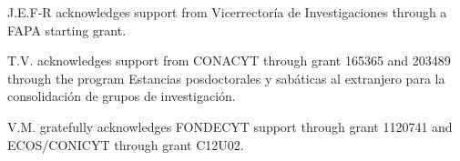 \documentclass{emulateapj}
\begin{document}
J.E.F-R acknowledges support from Vicerrector\'ia de
Investigaciones through a FAPA starting grant.

T.V. acknowledges support from CONACYT through grant 165365 and
203489 through the program Estancias posdoctorales y sab\'aticas al
extranjero para la consolidaci\'on de grupos de investigaci\'on.  

V.M. gratefully acknowledges FONDECYT support through grant 1120741
and ECOS/CONICYT through grant C12U02. 


 
\end{document}
